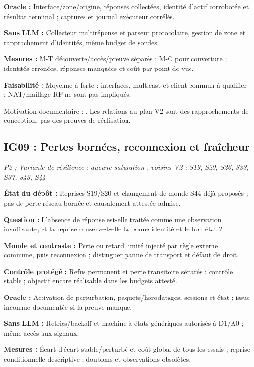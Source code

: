 \documentclass[11pt,a4paper]{article}
\begin{document}
\textbf{Oracle :} Interface/zone/origine, réponses collectées, identité d'actif corroborée et résultat terminal ; captures et journal exécuteur corrélés.

\textbf{Sans LLM :} Collecteur multiréponse et parseur protocolaire, gestion de zone et rapprochement d'identités, même budget de sondes.

\textbf{Mesures :} M-T découverte/accès/preuve séparés ; M-C pour couverture ; identités erronées, réponses manquées et coût par point de vue.

\textbf{Faisabilité :} Moyenne à forte : interfaces, multicast et client commun à qualifier ; NAT/maillage RF ne sont pas impliqués.

Motivation documentaire : \cite{mdns,scope6}. Les relations au plan V2 sont des rapprochements de conception, pas des preuves de réalisation.

\begin{samepage}\subsection{IG09 : Pertes bornées, reconnexion et fraîcheur}
\textit{P2 ; Variante de résilience ; aucune saturation ; voisins V2 : S19, S20, S26, S33, S37, S43, S44}

\textbf{État du dépôt :} Reprises S19/S20 et changement de monde S44 déjà proposés ; pas de perte réseau bornée et causalement attestée admise.
\par\end{samepage}
\textbf{Question :} L'absence de réponse est-elle traitée comme une observation insuffisante, et la reprise conserve-t-elle la bonne identité et le bon état ?

\textbf{Monde et contraste :} Perte ou retard limité injecté par règle externe commune, puis reconnexion ; distinguer panne de transport et défaut de droit.

\textbf{Contrôle protégé :} Refus permanent et perte transitoire séparés ; contrôle stable ; objectif encore réalisable dans les budgets attesté.

\textbf{Oracle :} Activation de perturbation, paquets/horodatages, sessions et état ; issue inconnue documentée si la preuve manque.

\textbf{Sans LLM :} Retries/backoff et machine à états génériques autorisés à D1/A0 ; même accès aux signaux.

\textbf{Mesures :} Écart d'écart stable/perturbé et coût global de tous les essais ; reprise conditionnelle descriptive ; doublons et observations obsolètes.
\end{document}
